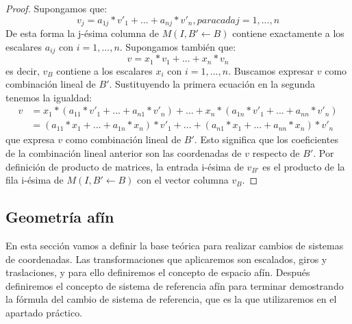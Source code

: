 \documentclass[a4paper,11pt, oneside]{book}
\begin{document}
\begin{proof}
	Supongamos que:
	\begin{equation}
	v_j = a_{1j}*v'_1 +...+ a_{nj}*v'_n, para cada j = 1,...,n
	\end{equation}
	De esta forma la j-ésima columna de $M(I, B' \leftarrow B)$  contiene exactamente a los escalares $a_{ij}$ con $i=1,...,n$. Supongamos también que:
	\begin{equation}
	v = x_1*v_1+...+x_n*v_n
	\end{equation}
	es decir, $v_B$ contiene a los escalares $x_i$ con $i=1,...,n$. Buscamos expresar $v$ como combinación lineal de $B'$. Sustituyendo la primera ecuación en la segunda tenemos la igualdad:
	\begin{equation}
	\begin{split}
	v &= x_1*(a_{11}*v'_{1}+...+a_{n1}*v'_n)+...+x_n*(a_{1n}*v'_1+...+a_{nn}*v'_n) \\
	 &= 
	 (a_{11}*x_1+...+a_{1n}*x_n)*v'_1 +...+(a_{n1}*x_1+...+a_{nn}*x_n)*v'_n
	 \end{split}
	\end{equation}
	que expresa $v$ como combinación lineal de $B'$. Esto significa que los coeficientes de la combinación lineal anterior son las coordenadas de $v$ respecto de $B'$. Por definición de producto de matrices, la entrada i-ésima de $v_{B'}$ es el producto de la fila i-ésima de $M(I, B' \leftarrow B)$ con el vector columna $v_B$.
\end{proof}

\subsection{Geometría afín}

En esta sección vamos a definir la base teórica para realizar cambios de sistemas de coordenadas. Las transformaciones que aplicaremos son escalados, giros y traslaciones, y para ello definiremos el concepto de espacio afín. Después definiremos el concepto de sistema de referencia afín para terminar demostrando la fórmula del cambio de sistema de referencia, que es la que utilizaremos en el apartado práctico.
\end{document}

